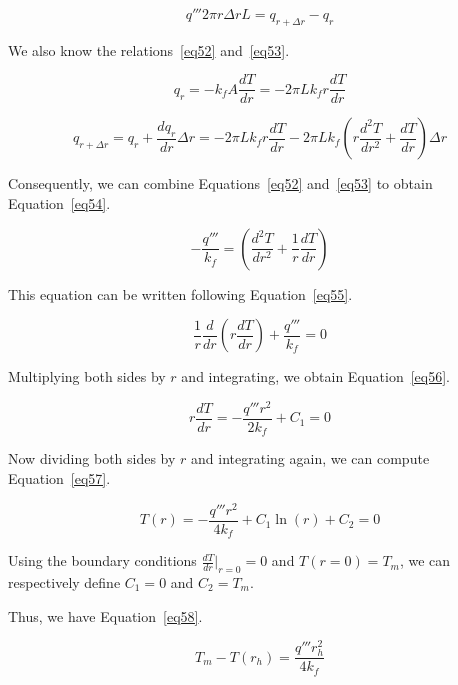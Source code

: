 \begin{equation}\label{eq51}
q'''2\pi r\Delta rL = q_{r+\Delta r} - q_r
\end{equation}

We also know the relations~\ref{eq52} and~\ref{eq53}.


\begin{equation}\label{eq52}
q_r = -k_fA\frac{dT}{dr} = -2\pi Lk_fr\frac{dT}{dr}
\end{equation}


\begin{equation}\label{eq53}
q_{r+\Delta r} = q_r + \frac{dq_r}{dr}\Delta r = -2\pi Lk_fr\frac{dT}{dr} - 2\pi Lk_f\left( r\frac{d^2T}{dr^2} + \frac{dT}{dr}\right)\Delta r
\end{equation}

Consequently, we can combine Equations~\ref{eq52} and~\ref{eq53} to obtain Equation~\ref{eq54}.


\begin{equation}\label{eq54}
- \frac{q'''}{k_f} = \left( \frac{d^2T}{dr^2} + \frac{1}{r}\frac{dT}{dr}\right)
\end{equation}

This equation can be written following Equation~\ref{eq55}.


\begin{equation}\label{eq55}
\frac{1}{r}\frac{d}{dr}\left( r\frac{dT}{dr}\right) + \frac{q'''}{k_f} = 0
\end{equation}

Multiplying both sides by $r$ and integrating, we obtain Equation~\ref{eq56}.


\begin{equation}\label{eq56}
r\frac{dT}{dr} = - \frac{q''' r^2}{2k_f} + C_1 = 0
\end{equation}

Now dividing both sides by $r$ and integrating again, we can compute Equation~\ref{eq57}.


\begin{equation}\label{eq57}
T(r) = - \frac{q''' r^2}{4k_f} + C_1\ln(r) + C_2 = 0
\end{equation}

Using the boundary conditions $\frac{dT}{dr}\bigg\rvert_{r=0} = 0$ and $T(r=0) = T_m$, we can respectively define $C_1 = 0$ and $C_2 = T_m$.

Thus, we have Equation~\ref{eq58}.

\begin{equation}\label{eq58}
T_m - T(r_h) = \frac{q''' r_h^2}{4k_f}
\end{equation}

